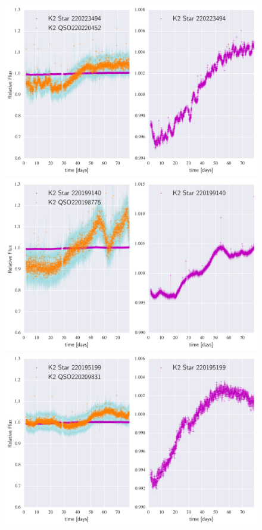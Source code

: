 \documentclass[a4paper,fleqn,usenatbib]{mnras}
\begin{document}
        	\begin{figure}
 	\includegraphics[width=\columnwidth]{220220452NearestNeighbor.png}
 	\includegraphics[width=\columnwidth]{220198775NearestNeighbor.png}
 	\includegraphics[width=\columnwidth]{220209831NearestNeighbor.png}
        	\caption{}
        	\label{fig:example_figure}
        \end{figure}   
        	        	
\end{document}
